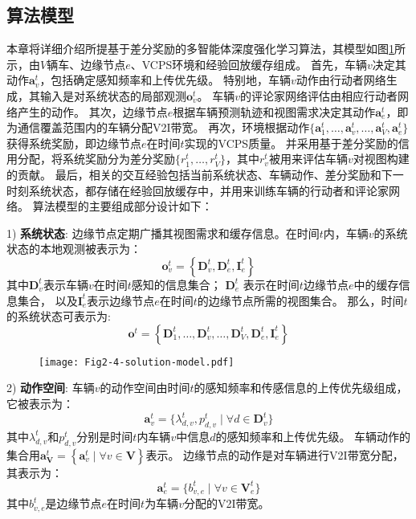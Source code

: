 \subsection{算法模型}
本章将详细介绍所提基于差分奖励的多智能体深度强化学习算法，其模型如图\ref{fig 2-4}所示，由$V$辆车、边缘节点$e$、VCPS环境和经验回放缓存组成。
首先，车辆$v$决定其动作$\boldsymbol{a}_{v}^{t}$，包括确定感知频率和上传优先级。
特别地，车辆$v$动作由行动者网络生成，其输入是对系统状态的局部观测$\boldsymbol{o}_{v}^{t}$。
车辆$v$的评论家网络评估由相应行动者网络产生的动作。
其次，边缘节点$e$根据车辆预测轨迹和视图需求决定其动作$\boldsymbol{a}_{e}^{t}$，即为通信覆盖范围内的车辆分配V2I带宽。
再次，环境根据动作$\{ \boldsymbol{a}_{1}^{t}, \ldots, \boldsymbol{a}_{v}^{t}, \ldots, \boldsymbol{a}_{V}^{t}, \boldsymbol{a}_{e}^{t}\}$ 获得系统奖励，即边缘节点$e$在时间$t$实现的VCPS质量。
并采用基于差分奖励\cite{foerster2018counterfactual}的信用分配，将系统奖励分为差分奖励$\{r_1^t, \ldots, r_{V}^t\}$，其中$r_v^t$被用来评估车辆$v$对视图构建的贡献。
最后，相关的交互经验包括当前系统状态、车辆动作、差分奖励和下一时刻系统状态，都存储在经验回放缓存中，并用来训练车辆的行动者和评论家网络。
算法模型的主要组成部分设计如下：

1) \textbf{系统状态}: 边缘节点定期广播其视图需求和缓存信息。在时间$t$内，车辆$v$的系统状态的本地观测被表示为：
	\begin{equation}
		\boldsymbol{o}_{v}^{t}=\left\{\mathbf{D}_{v}^{t}, \mathbf{D}_{e}^{t}, \mathbf{I}_e^t\right\}
	\end{equation} 
	\noindent 其中$\mathbf{D}_{v}^{t}$表示车辆$v$在时间$t$感知的信息集合；
	$\mathbf{D}_{e}^{t}$ 表示在时间$t$边缘节点$e$中的缓存信息集合，
	以及$\mathbf{I}_e^t$表示边缘节点$e$在时间$t$的边缘节点所需的视图集合。
	那么，时间$t$的系统状态可表示为:
	\begin{equation}
		\boldsymbol{o}^{t}=\left\{\mathbf{D}_{1}^{t}, \ldots, \mathbf{D}_{v}^{t}, \ldots, \mathbf{D}_{V}^{t}, \mathbf{D}_{e}^{t}, \mathbf{I}_{e}^{t}\right\}
	\end{equation}
	
\begin{figure}[t]
\centering
  \texttt{[image: Fig2-4-solution-model.pdf]}
  \label{fig 2-4}
\end{figure}

2) \textbf{动作空间}: 车辆$v$的动作空间由时间$t$的感知频率和传感信息的上传优先级组成，它被表示为：
	\begin{equation}
		\boldsymbol{a}_{v}^{t}=\{ \lambda_{d, v}^{t}, p_{d, v}^{t} \mid \forall d \in \mathbf{D}_{v}^t\}
	\end{equation}
	\noindent 其中$\lambda_{d, v}^{t}$和$p_{d, v}^{t}$分别是时间$t$内车辆$v$中信息$d$的感知频率和上传优先级。
	车辆动作的集合用$\boldsymbol{a}_{\mathbf{V}}^{t} = \left\{\boldsymbol{a}_{v}^{t}\mid \forall v \in \mathbf{V}\right\}$表示。
	边缘节点的动作是对车辆进行V2I带宽分配，其表示为：
	\begin{equation}
		\boldsymbol{a}_{e}^{t}=\{b_{v, e}^{t} \mid \forall v \in \mathbf{V}_{e}^{t}\}
	\end{equation}
	其中$b_{v, e}^t$是边缘节点$e$在时间$t$为车辆$v$分配的V2I带宽。
	
